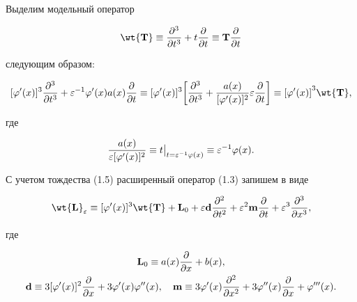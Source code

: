 Выделим модельный оператор


\begin{equation}


\wt{\bold{T}} \equiv \frac{\d^3}{\d t^3} + t \frac{\d}{\d t} \equiv


\bold{T}\frac{\partial}{\partial t}


\end{equation}


следующим образом:


\begin{equation}


[{\f '} (x)]^3 \frac{\d^3}{\d t^3} + \e^{-1} \f '(x) a(x)


\frac{\d}{\d t} \equiv [{\f ' (x)}]^3 \bigg[ \frac{\d^3}{\d


t^3} + \frac{a(x)}{[{\f ' (x)}]^2 } \e \frac{\d}{\d t}\bigg ]


\equiv [{\f ' (x)]}^3  \wt{\bold T},


\end{equation}


где


$$


\frac{a(x)}{{\e [ \f ' (x)}]^2 }\equiv t


\big|_{t=\e^{-1} \f(x)}


\equiv \e^{-1} \f (x).


$$





С учетом тождества (1.5) расширенный оператор (1.3) запишем в виде


\begin{equation}


\wt{\bold{L}}_{\e} \equiv [{\f ' (x)}]^3 


\wt{\bold{T}} + \bold{L}_0 + \e \bold{d} \frac{\d^2}{\d t^2 }


+ \e^2 \bold{m} \frac{\d}{\d t} + \e^3 \frac{\d^3}{\d x^3},


\end{equation}


где


\begin{gather}


\bold{L}_0 \equiv a(x) \frac{\d}{\d x} + b(x), \\


%


\bold{d} \equiv 3 [{\f ' (x)}]^2  \frac{\d}{\d x} + 3 \f '(x) \f ''(x), \quad


\bold{m} \equiv 3 \f '(x) \frac{\d^2}{\d x^2} + 3 \f ''(x) \frac{\d}{\d x} +


\f '''(x).


\end{gather}





